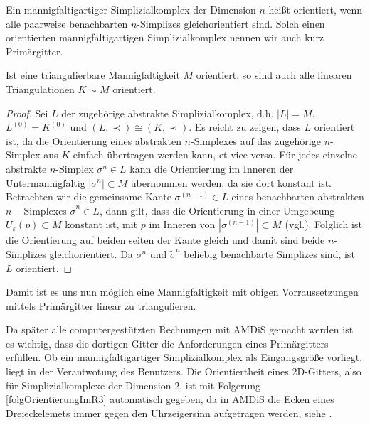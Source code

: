     \begin{definition}
      Ein mannigfaltigartiger Simplizialkomplex der Dimension \( n \) heißt orientiert, wenn alle paarweise benachbarten \( n \)-Simplizes
      gleichorientiert sind. Solch einen orientierten mannigfaltigartigen Simplizialkomplex nennen wir auch kurz Primärgitter.
    \end{definition}

    \begin{satz}
      Ist eine triangulierbare Mannigfaltigkeit \( M \) orientiert, so sind auch alle linearen Triangulationen \( K \sim M \) orientiert.
      \begin{proof}
        Sei \( L \) der zugehörige abstrakte Simplizialkomplex, d.h. \( |L|=M \), \( L^{(0)} = K^{(0)} \) und \( \left( L,\prec \right) \cong \left( K,\prec \right)\).
        Es reicht zu zeigen, dass \( L \) orientiert ist, da die Orientierung eines abstrakten \( n \)-Simplexes auf das zugehörige \( n \)-Simplex aus \( K \) einfach übertragen werden kann, et
        vice versa.
        Für jedes einzelne abstrakte \( n \)-Simplex \( \sigma^{n}\in L \) kann die Orientierung im Inneren der Untermannigfaltig \( |\sigma^{n}| \subset M \) übernommen werden, da sie dort
        konstant ist. 
        Betrachten wir die gemeinsame Kante \( \sigma^{(n-1)}\in L \) eines benachbarten abstrakten \( n- \)Simplexes \( \tilde{\sigma}^{n}\in L \), dann gilt, 
        dass die Orientierung in einer Umgebeung \( U_{\varepsilon}(p) \subset M \) konstant ist, mit \( p \) im Inneren von \( |\sigma^{(n-1)}|\subset M \) (vgl.\cite{jaenich}).
        Folglich ist die Orientierung auf beiden seiten der Kante gleich und damit sind beide \( n \)-Simplizes gleichorientiert.
        Da \( \sigma^{n} \) und \( \tilde{\sigma}^{n} \) beliebig benachbarte Simplizes sind, ist \( L \) orientiert.
      \end{proof}
    \end{satz}

    Damit ist es uns nun möglich eine Mannigfaltigkeit mit obigen Vorraussetzungen mittels Primärgitter linear zu triangulieren.

    \begin{bemerkung}
      Da später alle computergestützten Rechnungen mit AMDiS gemacht werden ist es wichtig, dass die dortigen Gitter die Anforderungen
      eines Primärgitters erfüllen. 
      Ob ein mannigfaltigartiger Simplizialkomplex als Eingangsgröße vorliegt, liegt in der Verantwotung des Benutzers.
      Die Orientiertheit eines 2D-Gitters, also für Simplizialkomplexe der Dimension 2, ist mit Folgerung \ref{folgOrientierungImR3} 
      automatisch gegeben, da in AMDiS die Ecken eines Dreieckelemets immer gegen den Uhrzeigersinn aufgetragen werden, siehe \cite{tutorial}.
    \end{bemerkung}




